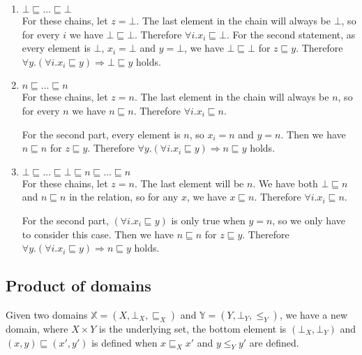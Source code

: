 \begin{enumerate}
{\begin{enumerate}
\item{$\bot \sqsubseteq \dots \sqsubseteq \bot$\\ 
For these chains, let $z = \bot$. The last element in the chain will always be $\bot$, so for every $i$ we have $\bot \sqsubseteq \bot$. Therefore $\forall i . x_i \sqsubseteq \bot$.
For the second statement, as every element is $\bot$, $x_i = \bot$ and $y = \bot$, we have $\bot \sqsubseteq \bot$ for $z \sqsubseteq y$. Therefore $\forall y. (\forall i . x_i \sqsubseteq y) \Rightarrow \bot \sqsubseteq y$ holds.}
\item{$n \sqsubseteq \dots \sqsubseteq n$ \\
 For these chains, let $z = n$. The last element in the chain will always be $n$, so for every $n$ we have $n \sqsubseteq n$. Therefore $\forall i . x_i \sqsubseteq n$.

For the second part, every element is $n$, so $x_i = n$ and $y = n$. Then we have $n \sqsubseteq n$ for $z \sqsubseteq y$. Therefore $\forall y. (\forall i . x_i \sqsubseteq y) \Rightarrow n \sqsubseteq y$ holds.}
\item{$\bot \sqsubseteq \dots \sqsubseteq \bot \sqsubseteq n \sqsubseteq \dots \sqsubseteq n$\\
For these chains, let $z = n$.  The last element will be $n$. We have both $\bot \sqsubseteq n$ and $n \sqsubseteq n$ in the relation, so for any $x$, we have $x \sqsubseteq n$. Therefore $\forall i . x_i \sqsubseteq n$.

For the second part, $(\forall i . x_i \sqsubseteq y)$ is only true when $y = n$, so we only have to consider this case. Then we have $n \sqsubseteq n$ for $z \sqsubseteq y$. Therefore $\forall y. (\forall i . x_i \sqsubseteq y) \Rightarrow n \sqsubseteq y$ holds.}
\end{enumerate}}
\end{enumerate}

\subsection{Product of domains}\label{prod}
Given two domains $\mathbb{X} = (X, \bot_X, \sqsubseteq_X)$ and $\mathbb{Y} = (Y, \bot_Y, \leq_Y)$, we have a new domain,  where $X \times Y$ is the underlying set, the bottom element is $(\bot_X, \bot_Y)$ and $(x,y) \sqsubseteq (x',y')$ is defined when $x \sqsubseteq_X x'$ and $y \leq_Y y'$ are defined.

\vspace{0.25cm}

